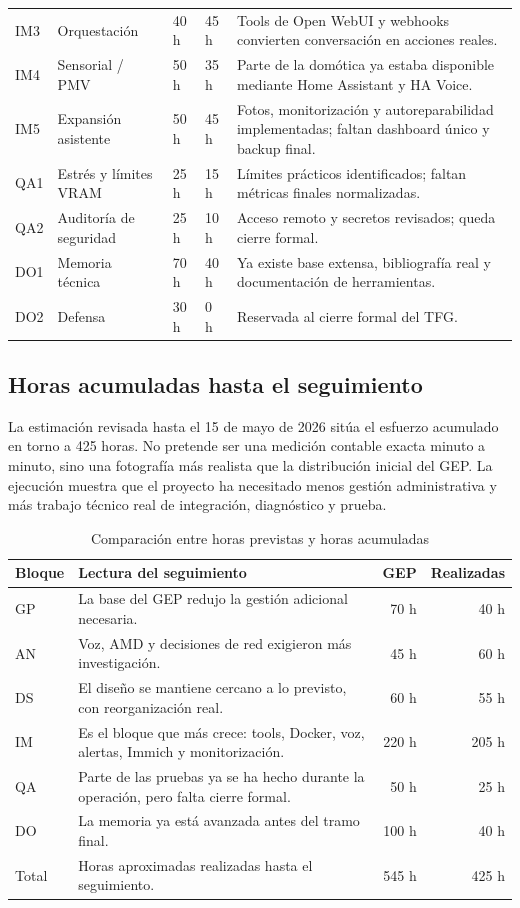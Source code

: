 \begin{longtable}{p{}p{}p{}p{}p{}}
  IM3 & Orquestación & 40 h & 45 h & Tools de Open WebUI y webhooks convierten conversación en acciones reales. \\
  IM4 & Sensorial / PMV & 50 h & 35 h & Parte de la domótica ya estaba disponible mediante Home Assistant y HA Voice. \\
  IM5 & Expansión asistente & 50 h & 45 h & Fotos, monitorización y autoreparabilidad implementadas; faltan dashboard único y backup final. \\
  QA1 & Estrés y límites VRAM & 25 h & 15 h & Límites prácticos identificados; faltan métricas finales normalizadas. \\
  QA2 & Auditoría de seguridad & 25 h & 10 h & Acceso remoto y secretos revisados; queda cierre formal. \\
  DO1 & Memoria técnica & 70 h & 40 h & Ya existe base extensa, bibliografía real y documentación de herramientas. \\
  DO2 & Defensa & 30 h & 0 h & Reservada al cierre formal del TFG. \\
\end{longtable}

\subsection{Horas acumuladas hasta el seguimiento}
La estimación revisada hasta el 15 de mayo de 2026 sitúa el esfuerzo acumulado en torno a 425 horas. No pretende ser una medición contable exacta minuto a minuto, sino una fotografía más realista que la distribución inicial del GEP. La ejecución muestra que el proyecto ha necesitado menos gestión administrativa y más trabajo técnico real de integración, diagnóstico y prueba.

\begin{table}[H]
  \centering
  \caption{Comparación entre horas previstas y horas acumuladas}
  \label{tab:horas-acumuladas-seguimiento}
  \begin{tabularx}{\textwidth}{lXrr}
    \toprule
    Bloque & Lectura del seguimiento & GEP & Realizadas \\
    \midrule
    GP & La base del GEP redujo la gestión adicional necesaria. & 70 h & 40 h \\
    AN & Voz, AMD y decisiones de red exigieron más investigación. & 45 h & 60 h \\
    DS & El diseño se mantiene cercano a lo previsto, con reorganización real. & 60 h & 55 h \\
    IM & Es el bloque que más crece: tools, Docker, voz, alertas, Immich y monitorización. & 220 h & 205 h \\
    QA & Parte de las pruebas ya se ha hecho durante la operación, pero falta cierre formal. & 50 h & 25 h \\
    DO & La memoria ya está avanzada antes del tramo final. & 100 h & 40 h \\
    \midrule
    Total & Horas aproximadas realizadas hasta el seguimiento. & 545 h & 425 h \\
    \bottomrule
  \end{tabularx}
\end{table}

